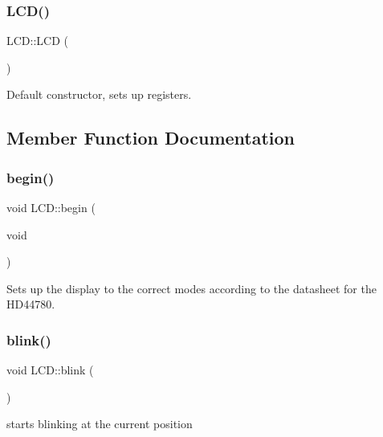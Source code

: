 \subsubsection{\texorpdfstring{L\+C\+D()}{LCD()}}
{\footnotesize\ttfamily L\+C\+D\+::\+L\+CD (\begin{DoxyParamCaption}{ }\end{DoxyParamCaption})}



Default constructor, sets up registers. 



\subsection{Member Function Documentation}
\mbox{\label{class_l_c_d_aa8f5c322edfcbbd78c719a8a9d6f1600}} 
\subsubsection{\texorpdfstring{begin()}{begin()}}
{\footnotesize\ttfamily void L\+C\+D\+::begin (\begin{DoxyParamCaption}\item[{void}]{ }\end{DoxyParamCaption})}



Sets up the display to the correct modes according to the datasheet for the H\+D44780. 

\mbox{\label{class_l_c_d_a878b36878fa8287093964eba83aace77}} 
\subsubsection{\texorpdfstring{blink()}{blink()}}
{\footnotesize\ttfamily void L\+C\+D\+::blink (\begin{DoxyParamCaption}{ }\end{DoxyParamCaption})}



starts blinking at the current position 

\mbox{\label{class_l_c_d_a2a7ee75f1a8fd2fb6f812ab7c60dc487}} 
